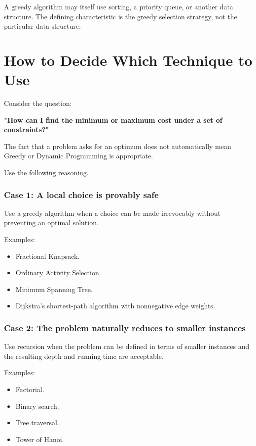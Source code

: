 A greedy algorithm may itself use sorting, a priority queue, or another data structure. The defining characteristic is the greedy selection strategy, not the particular data structure.

\section{How to Decide Which Technique to Use}

Consider the question:

\textbf{"How can I find the minimum or maximum cost under a set of constraints?"}

The fact that a problem asks for an optimum does not automatically mean Greedy or Dynamic Programming is appropriate.

Use the following reasoning.

\subsubsection{Case 1: A local choice is provably safe}

Use a greedy algorithm when a choice can be made irrevocably without preventing an optimal solution.

Examples:

\begin{itemize}
    \item Fractional Knapsack.
    \item Ordinary Activity Selection.
    \item Minimum Spanning Tree.
    \item Dijkstra's shortest-path algorithm with nonnegative edge weights.
\end{itemize}

\subsubsection{Case 2: The problem naturally reduces to smaller instances}

Use recursion when the problem can be defined in terms of smaller instances and the resulting depth and running time are acceptable.

Examples:

\begin{itemize}
    \item Factorial.
    \item Binary search.
    \item Tree traversal.
    \item Tower of Hanoi.
\end{itemize}


